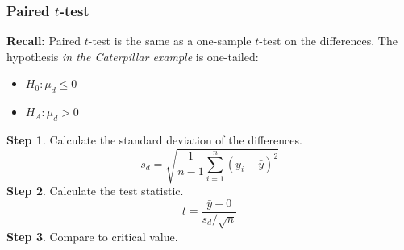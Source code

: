 \documentclass[color=usenames,dvipsnames]{beamer}\usepackage[]{graphicx}\usepackage[]{color}
\begin{document}
\begin{frame}[fragile]
  \frametitle{Paired $t$-test}
  {\bf Recall:} Paired $t$-test is the same as a one-sample $t$-test on the
      differences. The hypothesis \emph{in the Caterpillar example} is one-tailed:
  \begin{itemize}
    \item $H_0: \mu_d \le 0$
    \item $H_A: \mu_d > 0$
  \end{itemize}
  \pause
  \vfill
  \normalsize
  {\bf Step 1}. Calculate the standard deviation of the differences.
  \[
    s_d = \sqrt{\frac{1}{n-1} \sum_{i=1}^n
        (y_i - \bar{y})^2}%
  \]
  \pause
  \vfill
  {\bf Step 2}. Calculate the test statistic.
  \[
     t = \frac{\bar{y} - 0}{s_d/\sqrt{n}}
  \]
  {\bf Step 3}. Compare to critical value.
\end{frame}







\end{document}
